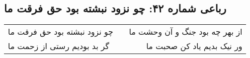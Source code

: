 \begin{center}
\section*{رباعی شماره ۴۲: چو نزود نبشته بود حق فرقت ما}
\label{sec:0042}
\begin{longtable}{l p{0.5cm} r}
چو نزود نبشته بود حق فرقت ما
&&
از بهر چه بود جنگ و آن وحشت ما
\\
گر بد بودیم رستی از زحمت ما
&&
ور نیک بدیم یاد کن صحبت ما
\\
\end{longtable}
\end{center}
